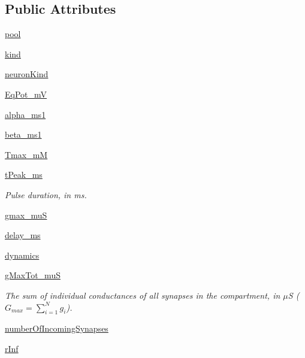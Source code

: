 \subsection*{Public Attributes}
\begin{DoxyCompactItemize}
\item 
\hyperlink{class_synapse_1_1_synapse_a133990bf3ab7f1efa8b416be73d07a11}{pool}
\item 
\hyperlink{class_synapse_1_1_synapse_aa2ea45450a3ad13cfefcae9fabe6ce15}{kind}
\item 
\hyperlink{class_synapse_1_1_synapse_a031af2fe7be76f9b5f69c087228a1b9a}{neuron\+Kind}
\item 
\hyperlink{class_synapse_1_1_synapse_adc80e9a62c17b29a92c2e7a0413e572d}{Eq\+Pot\+\_\+mV}
\item 
\hyperlink{class_synapse_1_1_synapse_ae15502cd5d5604d38328b2b1432477d7}{alpha\+\_\+ms1}
\item 
\hyperlink{class_synapse_1_1_synapse_ab59f413cbd21555531be209dee307a97}{beta\+\_\+ms1}
\item 
\hyperlink{class_synapse_1_1_synapse_ae4bcd698c5be77c2a6629d511d75f046}{Tmax\+\_\+mM}
\item 
\hyperlink{class_synapse_1_1_synapse_a09b9b092efcb0d6745fa32fadcd46375}{t\+Peak\+\_\+ms}
\begin{DoxyCompactList}\small\item\em Pulse duration, in ms. \end{DoxyCompactList}\item 
\hyperlink{class_synapse_1_1_synapse_a7922dac4765183cb6052905cc0d251cb}{gmax\+\_\+muS}
\item 
\hyperlink{class_synapse_1_1_synapse_a14adfda48133bd314f4dcd65fc9a2366}{delay\+\_\+ms}
\item 
\hyperlink{class_synapse_1_1_synapse_a67a1454de1ef2f08ffa3a10bf8466158}{dynamics}
\item 
\hyperlink{class_synapse_1_1_synapse_a470750725ecb176e048a973b9dc23ea3}{g\+Max\+Tot\+\_\+muS}
\begin{DoxyCompactList}\small\item\em The sum of individual conductances of all synapses in the compartment, in $\mu$S ( $G_{max} = \limits\sum_{i=1}^Ng_i$). \end{DoxyCompactList}\item 
\hyperlink{class_synapse_1_1_synapse_a6e55e008336cc47551669f3d77248d57}{number\+Of\+Incoming\+Synapses}
\item 
\hyperlink{class_synapse_1_1_synapse_afd263d49a97910efd8955a2aadef50e0}{r\+Inf}

\end{DoxyCompactItemize}

